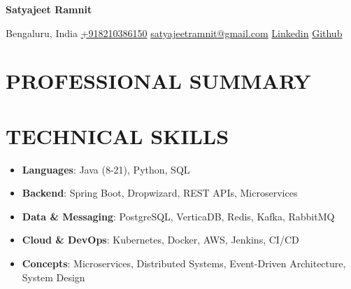 \documentclass[a4paper,10pt]{article}
\begin{document}
\begin{center}
    \textbf{\Huge{Satyajeet Ramnit}}
    \vspace{0.12in}
    
    \small Bengaluru, India 
    \quad \textbar \quad
    \href{tel:+918210386150}{+918210386150} 
    \quad \textbar \quad
    \href{mailto:satyajeetramnit@gmail.com}{ satyajeetramnit@gmail.com} 
    \quad \textbar \quad
    \href{https://linkedin.com/in/satyajeetramnit/}{Linkedin} 
    \quad \textbar \quad
    \href{https://github.com/satyajeetramnit}{Github}
\end{center}

\vspace{0.1in}

\section*{PROFESSIONAL SUMMARY}

\vspace{0.1in}
\section*{TECHNICAL SKILLS}
\begin{itemize}
    \item[\textbullet] \textbf{Languages}: \hspace{0.51in} Java (8-21), Python, SQL
    \item[\textbullet] \textbf{Backend}: \hspace{0.64in} Spring Boot, Dropwizard, REST APIs, Microservices
    \item[\textbullet] \textbf{Data \& Messaging}: PostgreSQL, VerticaDB, Redis, Kafka, RabbitMQ
    \item[\textbullet] \textbf{Cloud \& DevOps}: \hspace{0.05in} Kubernetes, Docker, AWS, Jenkins, CI/CD
    \item[\textbullet] \textbf{Concepts}: \hspace{0.6in} Microservices, Distributed Systems, Event-Driven Architecture, System Design
\end{itemize}
\end{document}
